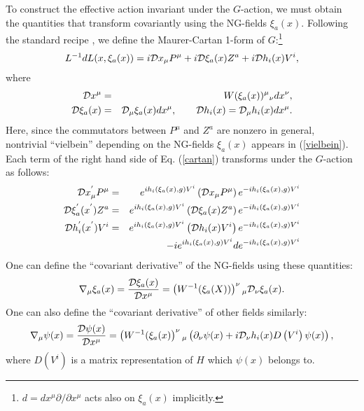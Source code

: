 \documentclass[a4paper,12pt]{article}
\begin{document}
To construct the effective action invariant under the
$G$-action, we must obtain the quantities that transform covariantly
using the NG-fields $\xi_{a}(x)$.
Following the standard recipe \cite{Weinberg, Ogievetsky}, 
we define the Maurer-Cartan 1-form of
$G$:\footnote{$d = dx^{\mu} \partial/\partial x^{\mu}$ acts also on 
$\xi_{a}(x)$ implicitly.}
\begin{eqnarray}
L^{-1}dL(x,\xi_{a}(x)) = i {\cal D} x_{\mu} P^{\mu} + i {\cal D}
\xi_{a}(x) Z^{a} + i {\cal D} h_{i}(x) V^{i}, \label{cartan}
\end{eqnarray}
where 
\begin{eqnarray}
{\cal D}x^{\mu} &=& W(\xi_{a}(x))^{\mu}{}_{\nu} dx^{\nu}, \label{vielbein} \\
{\cal D} \xi_{a}(x) &=& {\cal D}_{\mu} \xi_{a}(x) dx^{\mu},
\qquad {\cal D} h_{i}(x) = {\cal D}_{\mu} h_{i}(x) dx^{\mu}.
\end{eqnarray}
Here, since the commutators between $P^{\mu}$ and $Z^{a}$ are nonzero
in general, nontrivial ``vielbein'' depending on the NG-fields $\xi_{a}(x)$ 
appears in (\ref{vielbein}).
Each term of the right hand side of Eq. (\ref{cartan}) 
transforms under the $G$-action as follows:
\begin{eqnarray}
{\cal D} x_{\mu}^{'} P^{\mu} &=& e^{i h_{i}(\xi_{a}(x), g) V^{i}} \left(
{\cal D} x_{\mu} P^{\mu} \right) e^{-i h_{i}(\xi_{a}(x), g) V^{i}} \\
{\cal D} \xi_{a}^{'}(x^{'}) Z^{a} &=& e^{i h_{i}(\xi_{a}(x), g) V^{i}} \left(
{\cal D} \xi_{a}(x) Z^{a} \right) e^{-i h_{i}(\xi_{a}(x), g) V^{i}} \\  
{\cal D} h_{i}^{'}(x^{'}) V^{i} &=& e^{i h_{i}(\xi_{a}(x), g) V^{i}} \left(
{\cal D} h_{i}(x) V^{i} \right) e^{-i h_{i}(\xi_{a}(x), g) V^{i}} \\
&& - i e^{i h_{i}(\xi_{a}(x), g) V^{i}} d e^{-i h_{i}(\xi_{a}(x), g) V^{i}}
\end{eqnarray}  
One can define the ``covariant derivative'' of the NG-fields 
using these quantities:
\begin{eqnarray}
\nabla_{\mu}\xi_{a}(x) = \frac{{\cal D}{\xi_{a}(x)}}{{\cal D} x^{\mu}}
= \left( W^{-1}(\xi_{a}(X)) \right)^{\nu}{}_{\mu} {\cal
D}_{\nu} \xi_{a}(x).
\end{eqnarray}
One can also define the ``covariant derivative'' of other fields
similarly:
\begin{eqnarray}
\nabla_{\mu}\psi(x) = \frac{{\cal D}{\psi(x)}}{{\cal D} x^{\mu}}
= \left( W^{-1}(\xi_{a}(x) \right)^{\nu}{}_{\mu} 
\left( \partial_{\nu} \psi(x) + i {\cal D}_{\nu} h_{i}(x) D\left( V^{i} 
\right) \psi(x) \right), \label{derivative of psi}
\end{eqnarray}
where $D\left( V^{i} \right)$ is a matrix representation of $H$ 
which $\psi(x)$ belongs to.
\end{document}
